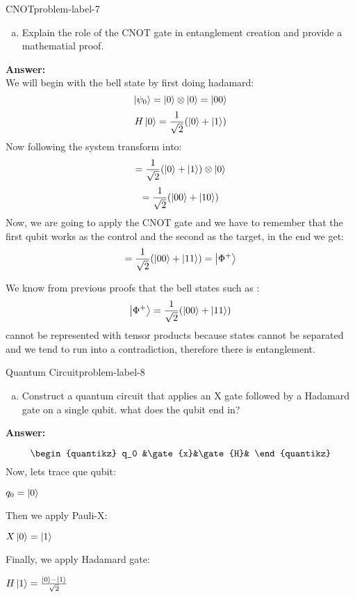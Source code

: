 \begin{problem}{CNOT}{problem-label-7}
	
	\begin{enumerate}[(a)]
		\item Explain the role of the CNOT gate in entanglement creation and provide a mathematial proof.
	\end{enumerate}
	\textbf{Answer:}\\
	We will begin with the bell state by first doing hadamard:
	\[
	\ket{\psi_0} = \ket{0} \otimes \ket{0} = \ket{00}
	\]
	\[
	H\ket{0} = \frac{1}{\sqrt{2}} (\ket{0}+\ket{1})
	\]
	Now following the system transform into:
	\[
	= \frac{1}{\sqrt{2}} (\ket{0}+\ket{1}) \otimes \ket{0}
	\]
	\[
	= \frac{1}{\sqrt{2}} (\ket{00}+\ket{10})
	\]
	Now, we are going to apply the CNOT gate and we have to remember that the first qubit works as the control and the second as the target, in the end we get:
		\[
	= \frac{1}{\sqrt{2}} (\ket{00}+\ket{11}) = \ket{\Phi^+}
	\]
	
	We know from previous proofs that the bell states such as :
	\[
	\ket{\Phi^+} = \frac{1}{\sqrt{2}} (\ket{00}+ \ket{11})
	\]
	cannot be represented with tensor products because states cannot be separated and we tend to run into a contradiction, therefore there is entanglement.
\end{problem}


\begin{problem}{Quantum Circuit}{problem-label-8}
	
	\begin{enumerate}[(a)]
		\item Construct a quantum circuit that applies an X gate followed by a Hadamard gate on a single qubit. what does the qubit end in?
	\end{enumerate}
	\textbf{Answer:}
	
	\[
	\begin{quantikz}
		q_0 &\gate{x}&\gate{H}&
	\end{quantikz}
	\]
	Now, lets trace que qubit:
	
	$q_0 = \ket{0}$
	
	Then we apply Pauli-X:
	
	$X\ket{0} = \ket{1}$
	
	Finally, we apply Hadamard gate:
	
	$H\ket{1} =  \frac{\ket{0}-\ket{1}}{\sqrt{2}} $
	
\end{problem}

